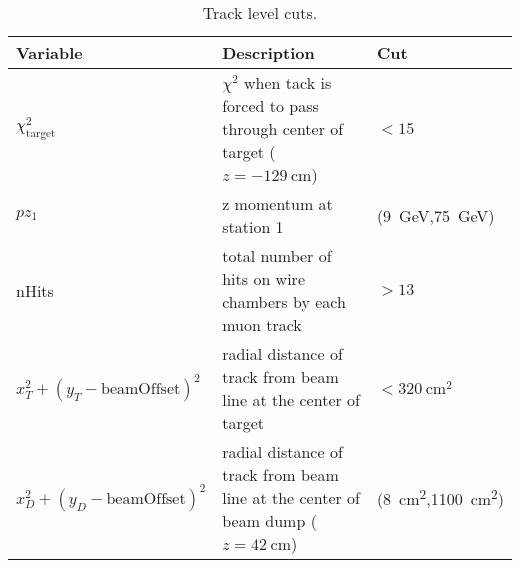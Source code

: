 \documentclass[../main.tex]{subfiles}
\begin{document}
\begin{table}[ht!]
	\centering
	\caption{Track level cuts.}
	\label{table:trackCut}
	\begin{tabular}{|m{4.5cm}|m{7cm}|m{3cm}|}
		\hline
		Variable                                                                                                                                                                                 & Description                                                                          & Cut                          \\ \hline
		$\chi^2_{\mathrm{target}}$                                                                                                                                                               & $\chi^2$ when tack is   forced to pass through center of target ($z=\SI{-129}{\cm}$) & $< 15$                       \\ \hline
		$pz_1$                                                                                                                                                                                   & z momentum at station 1                                                              & (\SI{9}{\GeV},\SI{75}{\GeV}) \\ \hline
		nHits                                                                                                                                                                                    & total number of hits on wire chambers by each   muon track                           & $> 13$                       \\ \hline
		$x_T^2 +(y_T - \mathrm{beamOffset})^2$                                                                                                                                                   & radial distance of track from   beam line at the center of target                    & $< \SI{320}{\cm\squared}$    \\ \hline
		$x_D^2 +(y_D - \mathrm{beamOffset})^2$                                                                                                                                                   &
		radial distance of track from   beam line at the center of beam dump ($z=\SI{42}{\cm}$)                                                                                                  &
		(\SI{8}{\cm\squared},\SI{1100}{\cm\squared})   \footnotemark[1]                                                                                                                                                                                                                                                \\ \hline

\end{tabular}
\end{table}
\end{document}
